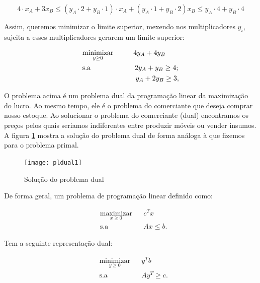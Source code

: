 \begin{equation}
4\cdot x_{A}+3x_{B}\leq(y_{A}\cdot2+y_{B}\cdot1)\cdot x_{A}+(y_{A}\cdot1+y_{B}\cdot2)x_{B}\leq y_{A}\cdot4+y_{B}\cdot4
\end{equation}

Assim, queremos minimizar o limite superior, mexendo nos multiplicadores
$y_{i}$, sujeita a esses multiplicadores gerarem um limite superior:

\begin{align}
    & \underset{y\geq0}{\text{minimizar}} \hspace{1cm} 4y_A+4y_B \label{eq6} \\
    & \text{s.a}  \hspace{2.2cm} 2y_A+y_B \geq 4; \label{eq7} \\
    &             \hspace{2.65cm} y_A+2y_B\geq 3, \label{eq8}
\end{align}

O problema acima é um problema dual da programação linear da maximização do lucro. Ao mesmo tempo, ele é o problema do comerciante que deseja comprar nosso estoque. Ao solucionar o problema do comerciante (dual) encontramos os preços pelos quais seriamos indiferentes entre produzir móveis ou vender insumos. A figura \ref{pldual1} mostra a solução do problema dual de forma análoga à que fizemos para o problema primal. 

\begin{figure}[H]
\begin{centering}
\texttt{[image: pldual1]}\protect\caption{\label{pldual1}Solução do problema dual}
\end{centering}
\end{figure}


De forma geral, um problema de programação linear definido como: 

\begin{equation*}
\begin{aligned}
& \underset{x\geq0}{\text{maximizar}}
& & c^{T}x \\
& \text{s.a}
& & Ax \leq b.
\end{aligned}
\end{equation*}

Tem a seguinte representação dual:

\begin{equation*}
\begin{aligned}
& \underset{y\geq0}{\text{minimizar}}
& & y^{T}b \\
& \text{s.a}
& & Ay^{T} \geq c.
\end{aligned}
\end{equation*}


